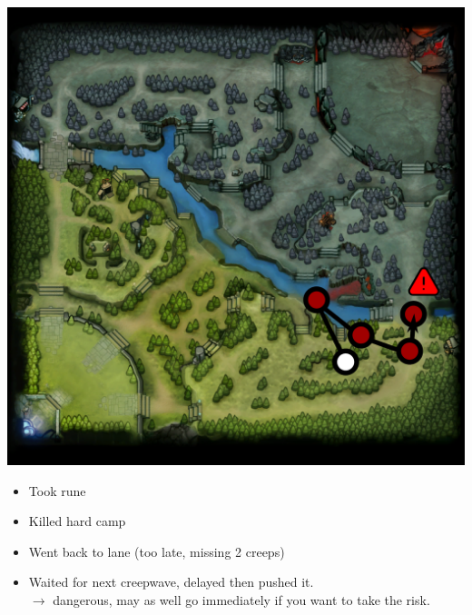 \documentclass{article}
\newenvironment{remarks}
    {
        \begin{description}
            \setlength\itemsep{0em}
    }
    {
        \end{description}
    }
\begin{document}
\begin{remarks}
{\begin{center}
    \begin{minipage}[t]{0.3\textwidth}
    \includegraphics[width=\textwidth]{img/1950bad.pdf} 
    \begin{itemize}
        \item Took rune
        \item Killed hard camp
        \item Went back to lane (too late, missing 2 creeps)
        \item Waited for next creepwave, delayed then pushed it.  \\ 
             $\rightarrow$ dangerous, may as well go immediately if you want to take the risk.
    \end{itemize}
   

\end{minipage}
\end{center}}
\end{remarks}
\end{document}
